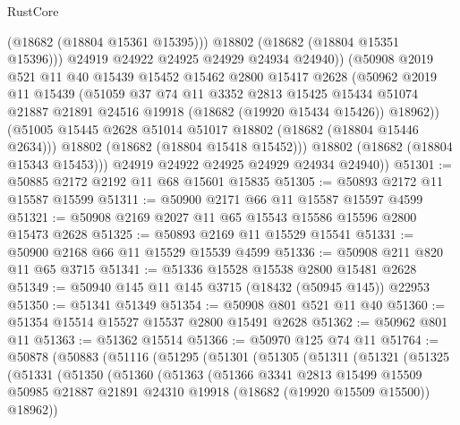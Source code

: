 \begin{lexlean}{RustCore}
\begin{coremodule}
                  (@18682 (@18804 @15361 @15395)))
                @18802
                (@18682 (@18804 @15351 @15396)))
              @24919
              @24922
              @24925
              @24929
              @24934
              @24940))
          (@50908
            @2019
            @521
            @11
            @40
            @15439
            @15452
            @15462
            @2800
            @15417
            @2628
            (@50962
              @2019
              @11
              @15439
              (@51059
                @37
                @74
                @11
                @3352
                @2813
                @15425
                @15434
                @51074
                @21887
                @21891
                @24516
                @19918
                (@18682 (@19920 @15434 @15426))
                @18962))
            (@51005 @15445 @2628 @51014 @51017 @18802 (@18682 (@18804 @15446 @2634)))
            @18802
            (@18682 (@18804 @15418 @15452)))
          @18802
          (@18682 (@18804 @15343 @15453)))
        @24919
        @24922
        @24925
        @24929
        @24934
        @24940))
@51301 := @50885 @2172 @2192 @11 @68 @15601 @15835
@51305 := @50893 @2172 @11 @15587 @15599
@51311 := @50900 @2171 @66 @11 @15587 @15597 @4599
@51321 := @50908 @2169 @2027 @11 @65 @15543 @15586 @15596 @2800 @15473 @2628
@51325 := @50893 @2169 @11 @15529 @15541
@51331 := @50900 @2168 @66 @11 @15529 @15539 @4599
@51336 := @50908 @211 @820 @11 @65 @3715
@51341 := @51336 @15528 @15538 @2800 @15481 @2628
@51349 := @50940 @145 @11 @145 @3715 (@18432 (@50945 @145)) @22953
@51350 := @51341 @51349
@51354 := @50908 @801 @521 @11 @40
@51360 := @51354 @15514 @15527 @15537 @2800 @15491 @2628
@51362 := @50962 @801 @11
@51363 := @51362 @15514
@51366 := @50970 @125 @74 @11
@51764 := @50878
    (@50883
      (@51116
        (@51295
          (@51301
            (@51305
              (@51311
                (@51321
                  (@51325
                    (@51331
                      (@51350
                        (@51360
                          (@51363
                            (@51366
                              @3341
                              @2813
                              @15499
                              @15509
                              @50985
                              @21887
                              @21891
                              @24310
                              @19918
                              (@18682 (@19920 @15509 @15500))
                              @18962))

\end{coremodule}
\end{lexlean}
